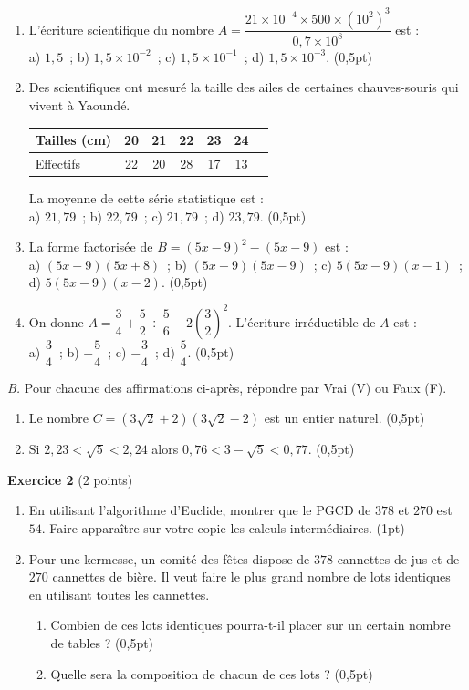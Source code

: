 \begin{enumerate}[label=\arabic*)]
\item L'écriture scientifique du nombre $A=\dfrac{21\times10^{-4}\times500\times(10^{2})^{3}}{0{,}7\times10^{8}}$
est : \\
a) $1{,}5$~; \quad b) $1{,}5\times10^{-2}$~; \quad c) $1{,}5\times10^{-1}$~; \quad
d) $1{,}5\times10^{-3}$. \hfill (0,5pt)
\item Des scientifiques ont mesuré la taille des ailes de certaines chauves-souris qui
vivent à Yaoundé.
\begin{center}
\small
\begin{tabular}{lcccccc}
\toprule
Tailles (cm) & 20 & 21 & 22 & 23 & 24 \\
\midrule
Effectifs & 22 & 20 & 28 & 17 & 13 \\
\bottomrule
\end{tabular}
\end{center}
La moyenne de cette série statistique est : \\
a) $21{,}79$~; \quad b) $22{,}79$~; \quad c) $21{,}79$~; \quad d) $23{,}79$. \hfill (0,5pt)
\item La forme factorisée de $B=(5x-9)^{2}-(5x-9)$ est : \\
a) $(5x-9)(5x+8)$~; \quad b) $(5x-9)(5x-9)$~; \quad c) $5(5x-9)(x-1)$~; \quad
d) $5(5x-9)(x-2)$. \hfill (0,5pt)
\item On donne $A=\dfrac34+\dfrac52\div\dfrac56-2\left(\dfrac32\right)^{2}$. L'écriture
irréductible de $A$ est : \\
a) $\dfrac34$~; \quad b) $-\dfrac54$~; \quad c) $-\dfrac34$~; \quad d) $\dfrac54$. \hfill
(0,5pt)
\end{enumerate}

\emph{B.} Pour chacune des affirmations ci-après, répondre par Vrai (V) ou Faux (F).
\begin{enumerate}[label=\arabic*)]
\item Le nombre $C=(3\sqrt2+2)(3\sqrt2-2)$ est un entier naturel. \hfill (0,5pt)
\item Si $2{,}23<\sqrt5<2{,}24$ alors $0{,}76<3-\sqrt5<0{,}77$. \hfill (0,5pt)
\end{enumerate}

\textbf{Exercice 2} (2 points)
\begin{enumerate}[label=\arabic*)]
\item En utilisant l'algorithme d'Euclide, montrer que le PGCD de $378$ et $270$ est $54$.
Faire apparaître sur votre copie les calculs intermédiaires. \hfill (1pt)
\item Pour une kermesse, un comité des fêtes dispose de $378$ cannettes de jus et de $270$
cannettes de bière. Il veut faire le plus grand nombre de lots identiques en utilisant
toutes les cannettes.
\begin{enumerate}[label=\alph*)]
\item Combien de ces lots identiques pourra-t-il placer sur un certain nombre de tables ?
\hfill (0,5pt)
\item Quelle sera la composition de chacun de ces lots ? \hfill (0,5pt)
\end{enumerate}
\end{enumerate}

